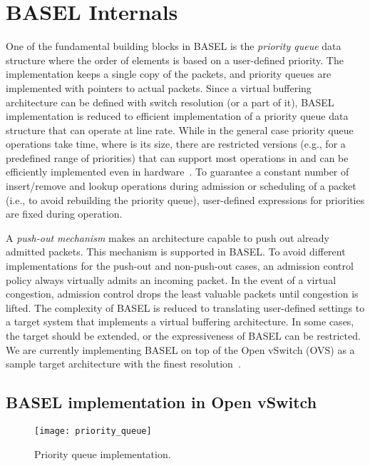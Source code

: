 \documentclass{article}
\newcommand{\barch}{BASEL}
\begin{document}
\section{\barch{} Internals}\label{sec:implementation}
One of the fundamental building blocks in \barch{} is the \emph{priority queue} data structure where the order of elements is based on a user-defined priority. The implementation keeps a single copy of the packets, and priority queues are implemented with pointers to actual packets. Since a virtual buffering architecture can be defined with switch resolution (or a part of it), \barch{} implementation is reduced to efficient implementation of a priority queue data structure that can operate at line rate. While in the general case priority queue operations take  time, where  is its size, there are restricted versions (e.g., for a predefined range of priorities) that can support most operations in  and can be efficiently implemented even in hardware~\cite{MortonLS07,IoannouK07}.
To guarantee a constant number of insert/remove and lookup operations during admission or scheduling of a packet (i.e., to avoid rebuilding the priority queue), user-defined expressions for priorities are fixed during operation.



A \emph{push-out mechanism} makes an architecture capable to push out already admitted packets. This mechanism is supported in \barch{}. To avoid different implementations for the push-out and non-push-out cases, an admission control policy always virtually admits an incoming packet. In the event of a virtual congestion, admission control drops the least valuable packets until congestion is lifted.
The complexity of \barch{} is reduced to translating user-defined settings to a target system that implements a virtual buffering architecture. In some cases, the target should be extended, or the expressiveness of \barch{} can be restricted. 
We are currently implementing \barch{} on top of the Open vSwitch (OVS) as a sample target
architecture with the finest resolution~\cite{ovs,PfaffPKJZRGWSSA15}. 




\subsection{\barch{} implementation in Open vSwitch}


\begin{figure}[t]
\centering
\hspace{-2mm}
\texttt{[image: priority\_queue]}
\vspace{-2.5\topsep}
\caption{Priority queue implementation.}
\vspace{-6pt}
\label{fig:priority_queue}
\end{figure}
\end{document}
